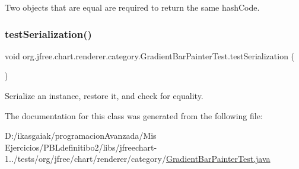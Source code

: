 Two objects that are equal are required to return the same hash\+Code. \mbox{\label{classorg_1_1jfree_1_1chart_1_1renderer_1_1category_1_1_gradient_bar_painter_test_a53e22f7177caaa5be20647631882bade}} 
\subsubsection{\texorpdfstring{test\+Serialization()}{testSerialization()}}
{\footnotesize\ttfamily void org.\+jfree.\+chart.\+renderer.\+category.\+Gradient\+Bar\+Painter\+Test.\+test\+Serialization (\begin{DoxyParamCaption}{ }\end{DoxyParamCaption})}

Serialize an instance, restore it, and check for equality. 

The documentation for this class was generated from the following file\+:\begin{DoxyCompactItemize}
\item 
D\+:/ikasgaiak/programacion\+Avanzada/\+Mis Ejercicios/\+P\+B\+Ldefinitibo2/libs/jfreechart-\/1../tests/org/jfree/chart/renderer/category/\mbox{\hyperlink{_gradient_bar_painter_test_8java}{Gradient\+Bar\+Painter\+Test.\+java}}\end{DoxyCompactItemize}
